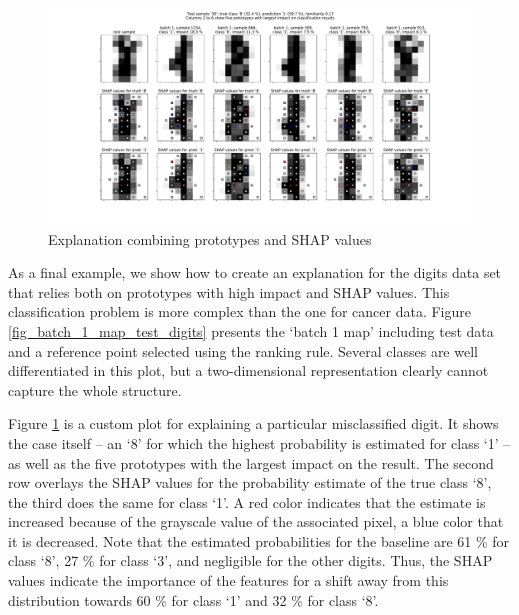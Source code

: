 \begin{figure}
\caption{Explanation combining prototypes and SHAP values}
\label{fig_impact_shap}
%
\begin{center}
\includegraphics[width=0.95\textheight, angle=90]{figures/digits_8_vs_1_explanation.pdf}
\end{center}
\end{figure}
%
As a final example, we show how to create an explanation for the digits data set that relies both on prototypes with high impact and SHAP values.
This classification problem is more complex than the one for cancer data.
Figure \ref{fig_batch_1_map_test_digits} presents the `batch 1 map' including test data and a reference point selected using the ranking rule.
Several classes are well differentiated in this plot, but a two-dimensional representation clearly cannot capture the whole structure.\par
%
Figure \ref{fig_impact_shap} is a custom plot for explaining a particular misclassified digit.
It shows the case itself -- an `8' for which the highest probability is estimated for class `1' -- as well as the five prototypes with the largest impact on the result.
The second row overlays the SHAP values for the probability estimate of the true class `8', the third does the same for class `1'.
A red color indicates that the estimate is increased because of the grayscale value of the associated pixel, a blue color that it is decreased.
Note that the estimated probabilities for the baseline are 61 \% for class `8', 27 \% for class `3', and negligible for the other digits.
Thus, the SHAP values indicate the importance of the features for a shift away from this distribution towards 60 \% for class `1' and 32 \% for class `8'.
%
\endinput
